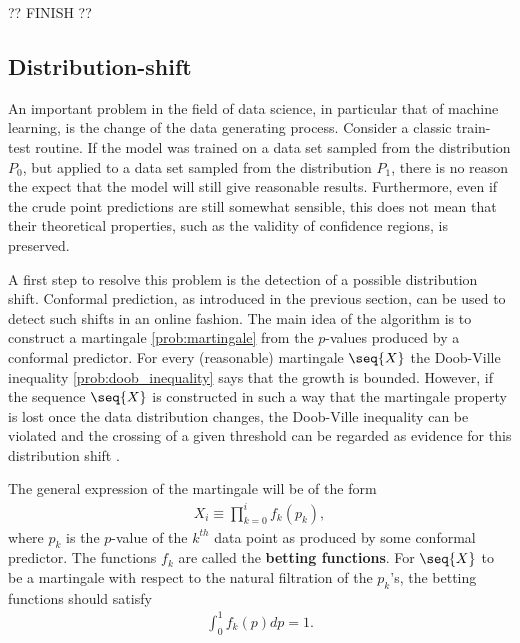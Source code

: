     ?? FINISH ??

\subsection{Distribution-shift}

    An important problem in the field of data science, in particular that of machine learning, is the change of the data generating process. Consider a classic train-test routine. If the model was trained on a data set sampled from the distribution $P_0$, but applied to a data set sampled from the distribution $P_1$, there is no reason the expect that the model will still give reasonable results. Furthermore, even if the crude point predictions are still somewhat sensible, this does not mean that their theoretical properties, such as the validity of confidence regions, is preserved.

    A first step to resolve this problem is the detection of a possible distribution shift. Conformal prediction, as introduced in the previous section, can be used to detect such shifts in an online fashion. The main idea of the algorithm is to construct a martingale \ref{prob:martingale} from the $p$-values produced by a conformal predictor. For every (reasonable) martingale $\seq{X}$ the Doob-Ville inequality \ref{prob:doob_inequality} says that the growth is bounded. However, if the sequence $\seq{X}$ is constructed in such a way that the martingale property is lost once the data distribution changes, the Doob-Ville inequality can be violated and the crossing of a given threshold can be regarded as evidence for this distribution shift \cite{cp_all}.

    The general expression of the martingale will be of the form
    \begin{gather}
        X_i\equiv\prod_{k=0}^if_k(p_k),
    \end{gather}
    where $p_k$ is the $p$-value of the $k^{th}$ data point as produced by some conformal predictor. The functions $f_k$ are called the \textbf{betting functions}. For $\seq{X}$ to be a martingale with respect to the natural filtration of the $p_k$'s, the betting functions should satisfy
    \begin{gather}
        \int_0^1f_k(p)dp = 1.
    \end{gather}

